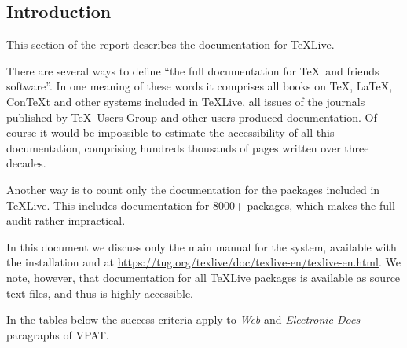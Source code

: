 \documentclass[titlepage]{article}
\newlength\vpatnumcollen
\begin{document}
\subsection{Introduction}
\label{sec:wcag-intro}

This section of the report describes the documentation for \TeX Live.

There are several ways to define ``the full documentation for \TeX\
and friends software''.  In one meaning of these words it comprises
all books on \TeX, \LaTeX, Con\TeX t and other systems included in
\TeX Live, all issues of the journals published by \TeX\ Users Group
and other users produced documentation.  Of course it would be
impossible to estimate the accessibility of all this documentation,
comprising hundreds thousands of pages written over three decades.

Another way is to count only the documentation for the packages
included in \TeX Live.  This includes documentation for 8000+
packages, which makes the full audit rather impractical.

In this document we discuss only the main manual for the system,
available with the installation and at
\url{https://tug.org/texlive/doc/texlive-en/texlive-en.html}.  We
note, however, that documentation for all \TeX Live packages is
available as source text files, and thus is highly accessible.  


In the tables below the success criteria apply to \emph{Web} and
\emph{Electronic Docs} paragraphs of VPAT.

\clearpage 
\settowidth{} 
\end{document}
